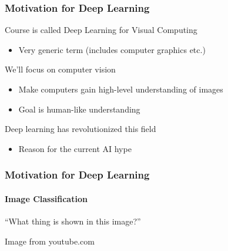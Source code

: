 \documentclass[xetex,professionalfont]{beamer}
\renewcommand\emph[1]{\textcolor{tuwcvl_cvl_blue}{#1}}
\begin{document}
\begin{frame}
\frametitle{Motivation for Deep Learning}

Course is called Deep Learning for \emph{Visual Computing}
\begin{itemize}
    \item Very generic term (includes computer graphics etc.) %
\end{itemize}

\bigskip

We'll focus on \emph{computer vision}
\begin{itemize}
    \item Make computers gain \emph{high-level} understanding of images
    \item Goal is human-like understanding %
\end{itemize}

\bigskip

\emph{Deep learning} has revolutionized this field
\begin{itemize}
    \item Reason for the current AI hype %
\end{itemize}

\end{frame}


\begin{frame}
\frametitle{Motivation for Deep Learning}
\framesubtitle{Image Classification}

\begin{center}
\enquote{What thing is shown in this image?}
\end{center}

\smallskip

\begin{center}
    {\centering Image from youtube.com}
\end{center}

\end{frame}
\end{document}
